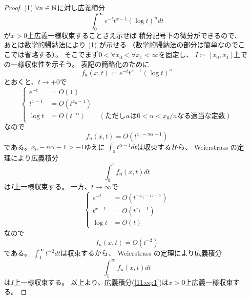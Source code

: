 \documentclass[report]{jlreq}
\begin{document}
\begin{proof}
    (1)
    $\forall n \in \mathbb{N}$に対し広義積分
    \begin{equation}
        \int_0^\infty e^{-t} t^{x-1} (\log t)^n dt
        \label{11:eq:1}
    \end{equation}
    が$x > 0$上広義一様収束することさえ示せば
    積分記号下の微分ができるので、
    あとは数学的帰納法により (1) が示せる
    （数学的帰納法の部分は簡単なのでここでは省略する）。
    そこでまず$0 < \forall x_0 < \forall x_1 < \infty$を固定し、
    $I \coloneqq [x_0, x_1]$上での一様収束性を示そう。
    表記の簡略化のために
    \begin{equation}
        f_n(x, t) \coloneqq e^{-t} t^{x-1} (\log t)^n
    \end{equation}
    とおくと、$t \to +0$で
    \begin{equation}
        \begin{cases}
            e^{-t} &= O(1) \\
            t^{x-1} &= O(t^{x_0 - 1}) \\
            \log t &= O(t^{-\alpha}) \qquad (\text{ただし$\alpha$は$0 < \alpha < x_0/n$なる適当な定数})
        \end{cases}
    \end{equation}
    なので
    \begin{equation}
        f_n(x, t) = O(t^{x_0 - n\alpha - 1})
    \end{equation}
    である。$x_0 - n\alpha - 1 > -1$ゆえに
    $\int_0^1 t^{\alpha - 1} dt$は収束するから、
    Weierstrass の定理により広義積分
    \begin{equation}
        \int_0^1 f_n(x, t) dt
    \end{equation}
    は$I$上一様収束する。
    一方、$t \to \infty$で
    \begin{equation}
        \begin{cases}
            e^{-t} &= O(t^{- x_1 - n - 1}) \\
            t^{x-1} &= O(t^{x_1 - 1}) \\
            \log t &= O(t)
        \end{cases}
    \end{equation}
    なので
    \begin{equation}
        f_n(x, t) = O(t^{-2})
    \end{equation}
    である。
    $\int_1^\infty t^{-2} dt$は収束するから、
    Weierstrass の定理により広義積分
    \begin{equation}
        \int_1^\infty f_n(x, t) dt
    \end{equation}
    は$I$上一様収束する。
    以上より、広義積分(\ref{11:eq:1})は$x > 0$上広義一様収束する。


\end{proof}
\end{document}
